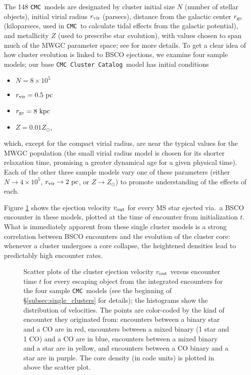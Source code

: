 \documentclass[twocolumn]{aastex631}
\newcommand{\CMC}{\texttt{CMC}}
\newcommand{\CMCcat}{\texttt{CMC Cluster Catalog}}
\begin{document}
The 148 \CMC\ models are designated by cluster initial size $N$ (number of stellar objects), initial virial radius $r_{\rm vir}$ (parsecs), distance from the galactic center $r_{\rm gc}$ (kiloparsecs, used in \CMC\ to calculate tidal effects from the galactic potential), and metallicity $Z$ (used to prescribe star evolution), with values chosen to span much of the MWGC parameter space; see \citet{2020IAUS..351..357K} for more details.
To get a clear idea of how cluster evolution is linked to BSCO ejections, we examine four sample models; our base \CMCcat\ model has initial conditions
\begin{itemize}
    \item $N = 8 \times 10^5$
    \item $r_{\rm vir} = 0.5~{\rm pc}$
    \item $r_{\rm gc} = 8~{\rm kpc}$
    \item $Z = 0.01Z_\odot$,
\end{itemize}
which, except for the compact virial radius, are near the typical values for the MWGC population (the small virial radius model is chosen for its shorter relaxation time, promising a greater dynamical age for a given physical time).
Each of the other three sample models vary one of these parameters (either $N \to 4 \times 10^5$, $r_{\rm vir} \to 2~{\rm pc}$, or $Z \to Z_\odot$) to promote understanding of the effects of each.

Figure \ref{fig:cmc_single_clusters} shows the ejection velocity $v_{\rm out}$ for every MS star ejected via.~a BSCO encounter in these models, plotted at the time of encounter from initialization $t$.
What is immediately apparent from these single cluster models is a strong correlation between BSCO encounters and the evolution of the cluster core: whenever a cluster undergoes a core collapse, the heightened densities lead to predictably high encounter rates.

\begin{figure*}
    \caption{
        Scatter plots of the cluster ejection velocity $v_{\rm out}$ versus encounter time $t$ for every escaping object from the integrated encounters for the four sample \CMC\ models (see the beginning of \S\ref{subsec:single_clusters} for details); the histograms show the distribution of velocities.
        The points are color-coded by the kind of encounter they originated from: encounters between a binary star and a CO are in red, encounters between a mixed binary (1 star and 1 CO) and a CO are in blue, encounters between a mixed binary and a star are in yellow, and encounters between a CO binary and a star are in purple.
        The core density (in code units) is plotted in above the scatter plot.
    }
    \label{fig:cmc_single_clusters}
\end{figure*}
\end{document}
